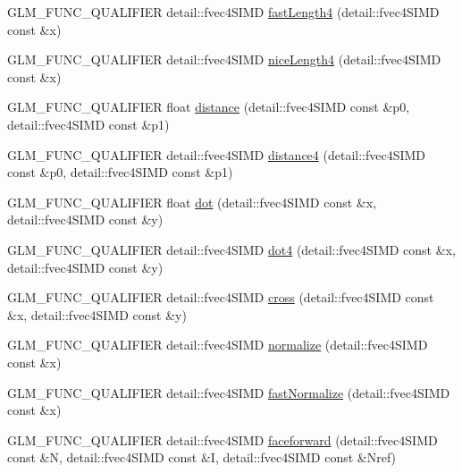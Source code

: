 \begin{DoxyCompactItemize}
\item 
G\+L\+M\+\_\+\+F\+U\+N\+C\+\_\+\+Q\+U\+A\+L\+I\+F\+I\+E\+R detail\+::fvec4\+S\+I\+M\+D \hyperlink{namespaceglm_a07438f3a62641a379456e932dd97b090}{fast\+Length4} (detail\+::fvec4\+S\+I\+M\+D const \&x)
\item 
G\+L\+M\+\_\+\+F\+U\+N\+C\+\_\+\+Q\+U\+A\+L\+I\+F\+I\+E\+R detail\+::fvec4\+S\+I\+M\+D \hyperlink{namespaceglm_a8279db21d38cadc5efaa0c8efababb1b}{nice\+Length4} (detail\+::fvec4\+S\+I\+M\+D const \&x)
\item 
G\+L\+M\+\_\+\+F\+U\+N\+C\+\_\+\+Q\+U\+A\+L\+I\+F\+I\+E\+R float \hyperlink{namespaceglm_ae716903872179576658f5eb6e2632558}{distance} (detail\+::fvec4\+S\+I\+M\+D const \&p0, detail\+::fvec4\+S\+I\+M\+D const \&p1)
\item 
G\+L\+M\+\_\+\+F\+U\+N\+C\+\_\+\+Q\+U\+A\+L\+I\+F\+I\+E\+R detail\+::fvec4\+S\+I\+M\+D \hyperlink{namespaceglm_a5256e6d2d2a82b810f92fc02f64819fb}{distance4} (detail\+::fvec4\+S\+I\+M\+D const \&p0, detail\+::fvec4\+S\+I\+M\+D const \&p1)
\item 
G\+L\+M\+\_\+\+F\+U\+N\+C\+\_\+\+Q\+U\+A\+L\+I\+F\+I\+E\+R float \hyperlink{namespaceglm_ae84ca0b0e48c6a79faac0eea8bc7a913}{dot} (detail\+::fvec4\+S\+I\+M\+D const \&x, detail\+::fvec4\+S\+I\+M\+D const \&y)
\item 
G\+L\+M\+\_\+\+F\+U\+N\+C\+\_\+\+Q\+U\+A\+L\+I\+F\+I\+E\+R detail\+::fvec4\+S\+I\+M\+D \hyperlink{namespaceglm_af55916a3764adaa7537f5e3e9ccacb81}{dot4} (detail\+::fvec4\+S\+I\+M\+D const \&x, detail\+::fvec4\+S\+I\+M\+D const \&y)
\item 
G\+L\+M\+\_\+\+F\+U\+N\+C\+\_\+\+Q\+U\+A\+L\+I\+F\+I\+E\+R detail\+::fvec4\+S\+I\+M\+D \hyperlink{namespaceglm_a06a52dedca29da951493c4c6f6020573}{cross} (detail\+::fvec4\+S\+I\+M\+D const \&x, detail\+::fvec4\+S\+I\+M\+D const \&y)
\item 
G\+L\+M\+\_\+\+F\+U\+N\+C\+\_\+\+Q\+U\+A\+L\+I\+F\+I\+E\+R detail\+::fvec4\+S\+I\+M\+D \hyperlink{namespaceglm_aabe6e7b8dbd2e5db215f973e474dd951}{normalize} (detail\+::fvec4\+S\+I\+M\+D const \&x)
\item 
G\+L\+M\+\_\+\+F\+U\+N\+C\+\_\+\+Q\+U\+A\+L\+I\+F\+I\+E\+R detail\+::fvec4\+S\+I\+M\+D \hyperlink{namespaceglm_a28640ee202fdb12ef3e836c257675043}{fast\+Normalize} (detail\+::fvec4\+S\+I\+M\+D const \&x)
\item 
G\+L\+M\+\_\+\+F\+U\+N\+C\+\_\+\+Q\+U\+A\+L\+I\+F\+I\+E\+R detail\+::fvec4\+S\+I\+M\+D \hyperlink{namespaceglm_ae3d9637fb22cf7eecd448c5ad341efab}{faceforward} (detail\+::fvec4\+S\+I\+M\+D const \&N, detail\+::fvec4\+S\+I\+M\+D const \&I, detail\+::fvec4\+S\+I\+M\+D const \&Nref)

\end{DoxyCompactItemize}
